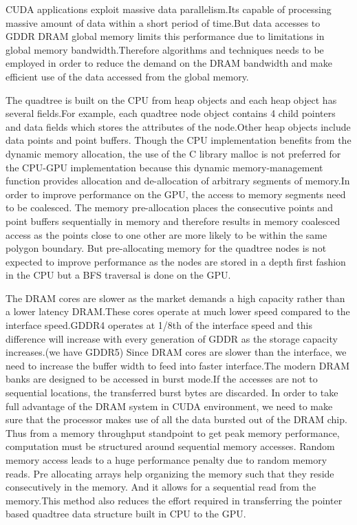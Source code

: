 \documentclass{article}
\begin{document}
CUDA applications exploit massive data parallelism.Its capable of processing massive amount of data within a short period of time.But data accesses to GDDR DRAM global memory limits this performance due to limitations in global memory bandwidth.Therefore algorithms and techniques needs to be employed in order to reduce the demand on the DRAM bandwidth  and make efficient use of the data accessed from the global memory.

The quadtree is built on the CPU from heap objects and each heap object has several fields.For example, each quadtree node object contains 4 child pointers and  data fields which stores the attributes of the node.Other heap objects include data points and point buffers.
Though the CPU implementation benefits from the dynamic memory allocation, the use of the C library malloc is not preferred for the CPU-GPU implementation because this dynamic memory-management function provides allocation and de-allocation of arbitrary segments of memory.In order to improve performance on the GPU, the access to memory segments need to be coalesced. The memory pre-allocation places the consecutive points and point buffers sequentially in memory and therefore results in memory coalesced access as the points close to one other are more likely to be within the same polygon boundary. But pre-allocating memory for the  quadtree nodes is not expected to improve performance as the nodes are stored in a depth first fashion in the CPU but a BFS traversal is  done on the GPU.

The DRAM cores are slower as the market demands a high capacity rather than a lower latency DRAM.These cores operate at much lower speed compared to the interface speed.GDDR4 operates at 1/8th of the interface speed and this difference will increase with every generation of GDDR as the storage capacity increases.(we have GDDR5)
Since DRAM cores are slower than the interface, we need to increase the buffer width to feed into faster interface.The modern DRAM banks are designed to be accessed in burst mode.If the accesses are not to sequential locations, the transferred burst bytes are discarded.
In order to take full advantage of the DRAM system in CUDA environment, we need to make sure that the processor makes use of all the data bursted out of the DRAM chip. 
Thus from a memory throughput standpoint to get peak memory performance, computation must be structured around sequential memory accesses. Random memory access leads to a huge performance penalty due to random memory reads. 
Pre allocating arrays help organizing the memory such that they reside consecutively in the memory. And it allows for a sequential read from the memory.This method also reduces the effort required in transferring the pointer based quadtree data structure built in CPU to the GPU.
 
\end{document}
